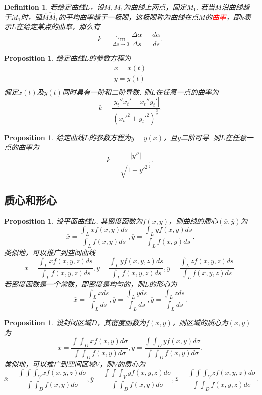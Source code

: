 \documentclass{article}
\newtheorem{proposition}[theorem]{Proposition}
\newtheorem{definition}[theorem]{Definition}
\newcommand{\redt}[1]{\textcolor{red}{#1}}
\begin{document}
\begin{definition}
\rm 若给定曲线$L$，设$M,M_1$为曲线上两点，固定$M_1$. 若当$M$沿曲线趋于$M_1$时，弧$\widehat{MM_1}$的平均曲率趋于一极限，这极限称为曲线在点$M$的\redt{曲率}，即$k$表示$L$在给定某点的曲率，那么有
$$
k =  \lim\limits_{\Delta s \to 0} \frac{\Delta \alpha}{\Delta s} = \frac{d\alpha}{ds}.
$$ 
\end{definition}

\begin{proposition}
\rm 给定曲线$L$的参数方程为
$$
\begin{array}{ll}
x = x(t) \\
y = y(t) \\
\end{array}
$$
假定$x(t)$及$y(t)$同时具有一阶和二阶导数. 则$L$在任意一点的曲率为
$$
k = \frac{|y_t''x_t'-x_t''y_t'|}{(x_t'^2 + y_t'^2)^{\frac{3}{2}}}.
$$
\end{proposition}

\begin{proposition}
\rm 给定曲线$L$的参数方程为$y=y(x)$，且$y$二阶可导. 则$L$在任意一点的曲率为
$$
k = \frac{|y''|}{\sqrt{1+y'^2}^{\frac{3}{2}}}.
$$
\end{proposition}


\subsection{质心和形心}

\begin{proposition}
\rm 设平面曲线$L$, 其密度函数为$f(x,y)$，则曲线的质心$(\overline{x},\overline{y})$为
$$
\overline{x} = \frac{\int_L xf(x,y)ds}{\int_L f(x,y)ds}, \overline{y} = \frac{\int_L yf(x,y)ds}{\int_L f(x,y)ds}.
$$
类似地，可以推广到空间曲线
$$
\overline{x} = \frac{\int_L xf(x,y,z)ds}{\int_L f(x,y,z)ds}, \overline{y} = \frac{\int_L yf(x,y,z)ds}{\int_L f(x,y,z)ds},
\overline{y} = \frac{\int_L zf(x,y,z)ds}{\int_L f(x,y,z)ds}.
$$
若密度函数是一个常数，即密度是均匀的，则$L$的形心为
$$
\overline{x} = \frac{\int_L xds}{\int_L ds}, \overline{y} = \frac{\int_L yds}{\int_L ds},
\overline{y} = \frac{\int_L zds}{\int_L ds}.
$$
\end{proposition}

\begin{proposition}
\rm 设封闭区域$D$，其密度函数为$f(x,y)$，则区域的质心为$(\overline{x},\overline{y})$为
$$
\overline{x} = \frac{\int\int_D xf(x,y)d\sigma}{\int\int_D f(x,y)d\sigma}, \overline{y} = \frac{\int\int_D yf(x,y)d\sigma}{\int\int_D f(x,y)d\sigma}.
$$
类似地，可以推广到空间区域$V$，则$V$的质心为
$$
\overline{x} = \frac{\int\int\int_V xf(x,y,z)d\sigma}{\int\int_D f(x,y)d\sigma}, 
\overline{y} = \frac{\int\int\int_V yf(x,y,z)d\sigma}{\int\int_D f(x,y)d\sigma},
\overline{z} = \frac{\int\int\int_V zf(x,y,z)d\sigma}{\int\int_D f(x,y,z)d\sigma}.
$$
\end{proposition}
\end{document}

